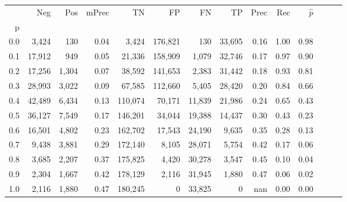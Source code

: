 \begin{tabular}{rrrrrrrrrrrrrr}
\toprule
{} &     Neg &    Pos & mPrec &       TN &       FP &      FN &      TP &  Prec &   Rec & $\hat{p}$ \\
p   &         &        &       &          &          &         &         &       &       &           \\
\midrule
0.0 &   3,424 &    130 &  0.04 &    3,424 &  176,821 &     130 &  33,695 &  0.16 &  1.00 &      0.98 \\
0.1 &  17,912 &    949 &  0.05 &   21,336 &  158,909 &   1,079 &  32,746 &  0.17 &  0.97 &      0.90 \\
0.2 &  17,256 &  1,304 &  0.07 &   38,592 &  141,653 &   2,383 &  31,442 &  0.18 &  0.93 &      0.81 \\
0.3 &  28,993 &  3,022 &  0.09 &   67,585 &  112,660 &   5,405 &  28,420 &  0.20 &  0.84 &      0.66 \\
0.4 &  42,489 &  6,434 &  0.13 &  110,074 &   70,171 &  11,839 &  21,986 &  0.24 &  0.65 &      0.43 \\
0.5 &  36,127 &  7,549 &  0.17 &  146,201 &   34,044 &  19,388 &  14,437 &  0.30 &  0.43 &      0.23 \\
0.6 &  16,501 &  4,802 &  0.23 &  162,702 &   17,543 &  24,190 &   9,635 &  0.35 &  0.28 &      0.13 \\
0.7 &   9,438 &  3,881 &  0.29 &  172,140 &    8,105 &  28,071 &   5,754 &  0.42 &  0.17 &      0.06 \\
0.8 &   3,685 &  2,207 &  0.37 &  175,825 &    4,420 &  30,278 &   3,547 &  0.45 &  0.10 &      0.04 \\
0.9 &   2,304 &  1,667 &  0.42 &  178,129 &    2,116 &  31,945 &   1,880 &  0.47 &  0.06 &      0.02 \\
1.0 &   2,116 &  1,880 &  0.47 &  180,245 &        0 &  33,825 &       0 &   nan &  0.00 &      0.00 \\
\bottomrule
\end{tabular}
